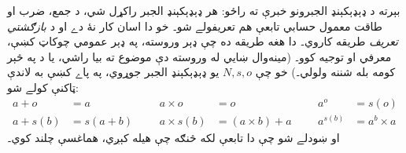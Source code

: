 \documentclass[../../../include/open-logic-section]{subfiles}
\begin{document}
بېرته د ډېډېکېنډ الجبرونو خبرې ته راځو: هر ډېډېکېنډ الجبر راکړل
شي، د جمع، ضرب او طاقت معمول حسابي تابعې هم تعريفولے شو۔ خو دا
اسان کار نۀ دے او د \emph{بازګشتي تعريف} طريقه کاروي۔ دا هغه طريقه
ده چې ډېر وروسته، په ډېر عمومي چوکاټ کښې، معرفي او توجيه کوو۔
(مينه‌وال ښايي له  وروسته دې
موضوع ته بيا راشي، يا د \citealt[pp.~95--8]{Potter2004} په څېر
کومه بله شننه ولولي۔) خو چې $N, s, o$ يو ډېډېکېنډ الجبر جوړوي، په
پاے کښې به لاندې ټاکنې کولے شو:
\begin{align*}
	{a} + {o} &= {a} & & & {a} \times {o} &= {o} & & & {a}^{o} &= s(o)\\
{a} + {s}({b}) &= {s}({a}+{b}) &&& {a} \times {s}({b}) &= ({a}\times {b}) + {a}  & & & {a}^{{s}({b})} &= {a}^{b} \times {a}
\end{align*}
او ښودلے شو چې دا تابعې لکه څنګه چې هيله کېږي، هماغسې چلند کوي۔
\end{document}

